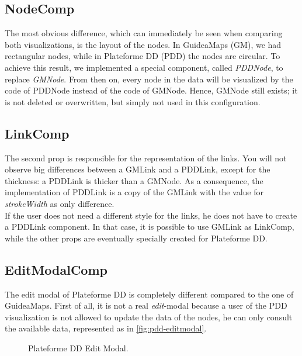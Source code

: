 \subsection{NodeComp}\label{sec:usecase-nodecomp}
The most obvious difference, which can immediately be seen when comparing both visualizations, is the layout of the nodes. In GuideaMaps (GM), we had rectangular nodes, while in Plateforme DD (PDD) the nodes are circular. To achieve this result, we implemented a special component, called \textit{PDDNode}, to replace \textit{GMNode}. From then on, every node in the data will be visualized by the code of PDDNode instead of the code of GMNode. Hence, GMNode still exists; it is not deleted or overwritten, but simply not used in this configuration.



\subsection{LinkComp}\label{sec:usecase-linkcomp}
The second prop is responsible for the representation of the links. You will not observe big differences between a GMLink and a PDDLink, except for the thickness: a PDDLink is thicker than a GMNode. As a consequence, the implementation of PDDLink is a copy of the GMLink with the value for \textit{strokeWidth} as only difference. \\

If the user does not need a different style for the links, he does not have to create a PDDLink component. In that case, it is possible to use GMLink as LinkComp, while the other props are eventually specially created for Plateforme DD.



\subsection{EditModalComp}\label{sec:usecase-editmodalcomp}
The edit modal of Plateforme DD is completely different compared to the one of GuideaMaps. First of all, it is not a real \textit{edit}-modal because a user of the PDD visualization is not allowed to update the data of the nodes, he can only consult the available data, represented as in \autoref{fig:pdd-editmodal}.

\begin{figure}[H]
	\centering
	\caption{Plateforme DD Edit Modal.}
	\label{fig:pdd-editmodal}
\end{figure}

